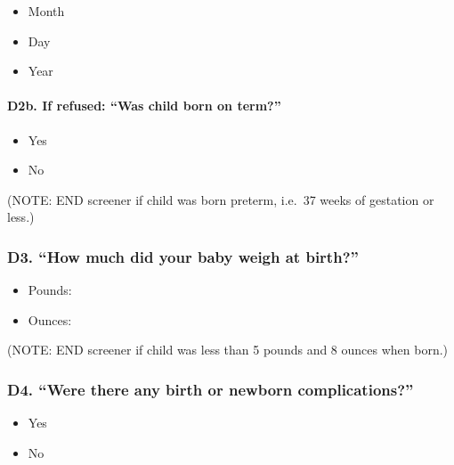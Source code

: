\documentclass[
  12pt,
]{book}
\providecommand{\tightlist}{%
  \setlength{\itemsep}{0pt}\setlength{\parskip}{0pt}}
\begin{document}
\begin{itemize}
\tightlist
\item
  Month
\item
  Day
\item
  Year
\end{itemize}

\hypertarget{d2b.-if-refused-was-child-born-on-term}{%
\paragraph*{D2b. If refused: ``Was child born on term?''}\label{d2b.-if-refused-was-child-born-on-term}}

\begin{itemize}
\tightlist
\item
  Yes
\item
  No
\end{itemize}

(NOTE: END screener if child was born preterm, i.e.~37 weeks of gestation or less.)

\hypertarget{d3.-how-much-did-your-baby-weigh-at-birth}{%
\subsubsection*{D3. ``How much did your baby weigh at birth?''}\label{d3.-how-much-did-your-baby-weigh-at-birth}}

\begin{itemize}
\tightlist
\item
  Pounds:\\
\item
  Ounces:
\end{itemize}

(NOTE: END screener if child was less than 5 pounds and 8 ounces when born.)

\hypertarget{d4.-were-there-any-birth-or-newborn-complications}{%
\subsubsection*{D4. ``Were there any birth or newborn complications?''}\label{d4.-were-there-any-birth-or-newborn-complications}}

\begin{itemize}
\tightlist
\item
  Yes
\item
  No
\end{itemize}
\end{document}
